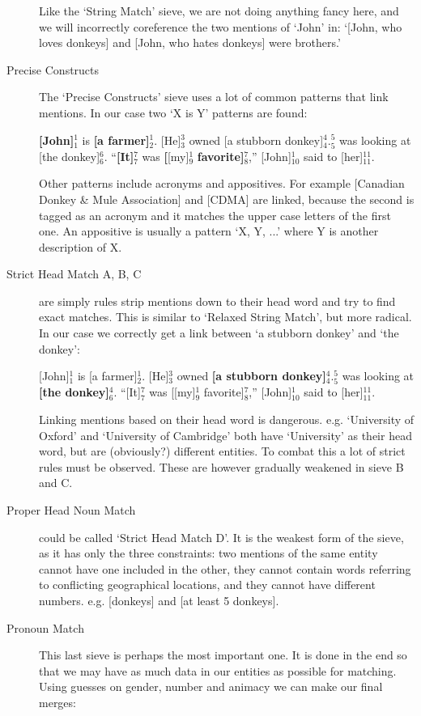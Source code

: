 \documentclass[12pt]{article}
\begin{document}
\begin{description}
Like the `String Match' sieve, we are not doing anything fancy here, and we will incorrectly coreference the two mentions of `John' in: `[John, who loves donkeys] and [John, who hates donkeys] were brothers.'
\item[Precise Constructs]
The `Precise Constructs' sieve uses a lot of common patterns that link mentions. In our case two `X is Y' patterns are found:

\textbf{[John]$_1^1$} is \textbf{[a farmer]$_2^1$}. [He]$_3^3$ owned [a stubborn donkey]$_4^4$.\newline
[A girl]$_5^5$ was looking at [the donkey]$_6^6$.\newline
``\textbf{[It]$_7^7$} was \textbf{[}[my]$_9^1$ \textbf{favorite]$_8^7$},'' [John]$_{10}^1$ said to [her]$_{11}^{11}$.

Other patterns include acronyms and appositives. For example [Canadian Donkey \& Mule Association] and [CDMA] are linked, because the second is tagged as an acronym and it matches the upper case letters of the first one. An appositive is usually a pattern `X, Y, ...' where Y is another description of X.
\item[Strict Head Match A, B, C] are simply rules strip mentions down to their head word and try to find exact matches. This is similar to `Relaxed String Match', but more radical. In our case we correctly get a link between `a stubborn donkey' and `the donkey':

[John]$_1^1$ is [a farmer]$_2^1$. [He]$_3^3$ owned \textbf{[a stubborn donkey]$_4^4$}.\newline
[A girl]$_5^5$ was looking at \textbf{[the donkey]$_6^4$}.\newline
``[It]$_7^7$ was [[my]$_9^1$ favorite]$_8^7$,'' [John]$_{10}^1$ said to [her]$_{11}^{11}$.

Linking mentions based on their head word is dangerous. e.g. `University of Oxford' and `University of Cambridge' both have `University' as their head word, but are (obviously?) different entities. To combat this a lot of strict rules must be observed. These are however gradually weakened in sieve B and C.
\item[Proper Head Noun Match] could be called `Strict Head Match D'. It is the weakest form of the sieve, as it has only the three constraints: two mentions of the same entity cannot have one included in the other, they cannot contain words referring to conflicting geographical locations, and they cannot have different numbers. e.g. [donkeys] and [at least 5 donkeys].
\item[Pronoun Match]
This last sieve is perhaps the most important one. It is done in the end so that we may have as much data in our entities as possible for matching. Using guesses on gender, number and animacy we can make our final merges:


\end{description}
\end{document}
